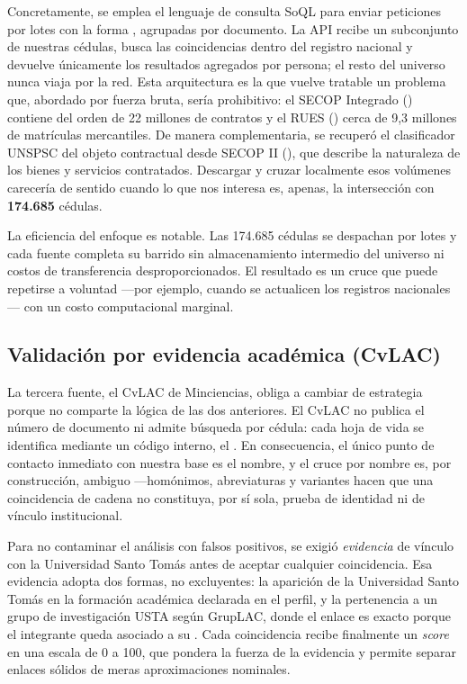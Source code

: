 Concretamente, se emplea el lenguaje de consulta SoQL para enviar peticiones por lotes con la forma , agrupadas por documento. La API recibe un subconjunto de nuestras cédulas, busca las coincidencias dentro del registro nacional y devuelve únicamente los resultados agregados por persona; el resto del universo nunca viaja por la red. Esta arquitectura es la que vuelve tratable un problema que, abordado por fuerza bruta, sería prohibitivo: el SECOP Integrado () contiene del orden de 22 millones de contratos y el RUES () cerca de 9,3 millones de matrículas mercantiles. De manera complementaria, se recuperó el clasificador UNSPSC del objeto contractual desde SECOP II (), que describe la naturaleza de los bienes y servicios contratados. Descargar y cruzar localmente esos volúmenes carecería de sentido cuando lo que nos interesa es, apenas, la intersección con \textbf{174.685} cédulas.

La eficiencia del enfoque es notable. Las 174.685 cédulas se despachan por lotes y cada fuente completa su barrido sin almacenamiento intermedio del universo ni costos de transferencia desproporcionados. El resultado es un cruce que puede repetirse a voluntad —por ejemplo, cuando se actualicen los registros nacionales— con un costo computacional marginal.

\subsection{Validación por evidencia académica (CvLAC)}

La tercera fuente, el CvLAC de Minciencias, obliga a cambiar de estrategia porque no comparte la lógica de las dos anteriores. El CvLAC no publica el número de documento ni admite búsqueda por cédula: cada hoja de vida se identifica mediante un código interno, el . En consecuencia, el único punto de contacto inmediato con nuestra base es el nombre, y el cruce por nombre es, por construcción, ambiguo —homónimos, abreviaturas y variantes hacen que una coincidencia de cadena no constituya, por sí sola, prueba de identidad ni de vínculo institucional.

Para no contaminar el análisis con falsos positivos, se exigió \emph{evidencia} de vínculo con la Universidad Santo Tomás antes de aceptar cualquier coincidencia. Esa evidencia adopta dos formas, no excluyentes: la aparición de la Universidad Santo Tomás en la formación académica declarada en el perfil, y la pertenencia a un grupo de investigación USTA según GrupLAC, donde el enlace es exacto porque el integrante queda asociado a su . Cada coincidencia recibe finalmente un \emph{score} en una escala de 0 a 100, que pondera la fuerza de la evidencia y permite separar enlaces sólidos de meras aproximaciones nominales.

